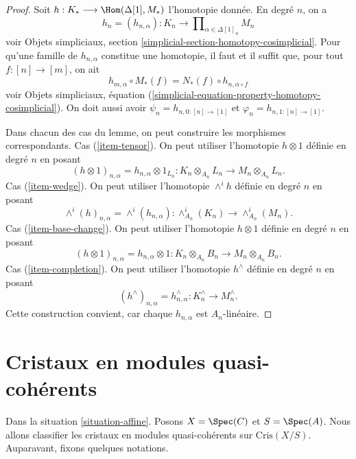 \begin{proof}
Soit $h : K_* \longrightarrow \Hom(\Delta[1], M_*)$ l'homotopie
donnée. En degré $n$, on a
$$
h_n = (h_{n, \alpha}) :
K_n \longrightarrow
\prod\nolimits_{\alpha \in \Delta[1]_n} M_n
$$
voir Objets simpliciaux, section \ref{simplicial-section-homotopy-cosimplicial}.
Pour qu'une famille de $h_{n, \alpha}$ constitue une homotopie,
il faut et il suffit que, pour tout $f : [n] \to [m]$, on
ait
$$
h_{m, \alpha} \circ M_*(f) = N_*(f) \circ h_{n, \alpha \circ f}
$$
voir
Objets simpliciaux, équation (\ref{simplicial-equation-property-homotopy-cosimplicial}).
On doit aussi avoir $\psi_n = h_{n, 0 : [n] \to [1]}$ et
$\varphi_n = h_{n, 1 : [n] \to [1]}$.

\medskip\noindent
Dans chacun des cas du lemme, on peut construire les morphismes correspondants.
Cas (\ref{item-tensor}). On peut utiliser l'homotopie $h \otimes 1$ définie
en degré $n$ en posant
$$
(h \otimes 1)_{n, \alpha} = h_{n, \alpha} \otimes 1_{L_n} :
K_n \otimes_{A_n} L_n
\longrightarrow
M_n \otimes_{A_n} L_n.
$$
Cas (\ref{item-wedge}). On peut utiliser l'homotopie $\wedge^ih$ définie
en degré $n$ en posant
$$
\wedge^i(h)_{n, \alpha} = \wedge^i(h_{n, \alpha}) :
\wedge^i_{A_n}(K_n)
\longrightarrow
\wedge^i_{A_n}(M_n).
$$
Cas (\ref{item-base-change}). On peut utiliser l'homotopie $h \otimes 1$ définie
en degré $n$ en posant
$$
(h \otimes 1)_{n, \alpha} = h_{n, \alpha} \otimes 1 :
K_n \otimes_{A_n} B_n
\longrightarrow
M_n \otimes_{A_n} B_n.
$$
Cas (\ref{item-completion}). On peut utiliser l'homotopie $h^\wedge$ définie
en degré $n$ en posant
$$
(h^\wedge)_{n, \alpha} = h_{n, \alpha}^\wedge :
K_n^\wedge
\longrightarrow
M_n^\wedge.
$$
Cette construction convient, car chaque $h_{n, \alpha}$ est $A_n$-linéaire.
\end{proof}






\section{Cristaux en modules quasi-cohérents}
\label{section-quasi-coherent-crystals}

\noindent
Dans la situation \ref{situation-affine}.
Posons $X = \Spec(C)$ et $S = \Spec(A)$. Nous allons
classifier les cristaux en modules quasi-cohérents sur $\text{Cris}(X/S)$.
Auparavant, fixons quelques notations.


